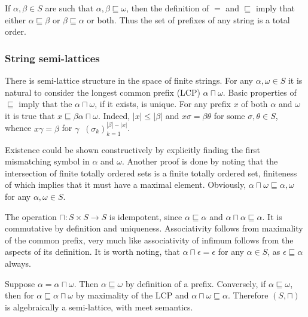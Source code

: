\documentclass[a4paper]{article}
\newcommand{\brac}[1]{{\left ( #1 \right )}}
\newcommand{\abs}[1]{{\left | #1 \right |}}
\newcommand{\defn}{\mathop{\overset{\Delta}{=}}\nolimits}
\begin{document}
If $\alpha, \beta\in S$ are such that $\alpha,\beta\sqsubseteq \omega$, then the definition of $=$ and $\sqsubseteq$ imply that either $\alpha\sqsubseteq\beta$ or $\beta\sqsubseteq\alpha$ or both. Thus the set of prefixes of any string is a total order.


\subsubsection{String semi-lattices} %
\label{ssub:string_semi_lattice}

There is semi-lattice structure in the space of finite strings. For any $\alpha,\omega\in S$ it is natural to consider the longest common prefix (LCP) $\alpha\sqcap \omega$. Basic properties of $\sqsubseteq$ imply that the $\alpha\sqcap \omega$, if it exists, is unique. For any prefix $x$ of both $\alpha$ and $\omega$ it is true that $x\sqsubseteq \beta \alpha\sqcap\omega$. Indeed, $\abs{x}\leq \abs{\beta}$ and $x\sigma = \beta\theta$ for some $\sigma,\theta\in S$, whence $x\gamma = \beta$ for $\gamma \defn \brac{\sigma_k}_{k=1}^{\abs{\beta}-\abs{x}}$.

Existence could be shown constructively by explicitly finding the first mismatching symbol in $\alpha$ and $\omega$. Another proof is done by noting that the intersection of finite totally ordered sets is a finite totally ordered set, finiteness of which implies that it must have a maximal element. Obviously, $\alpha\sqcap \omega\sqsubseteq \alpha,\omega$ for any $\alpha,\omega\in S$. 

The operation $\sqcap:S\times S\to S$ is idempotent, since $\alpha\sqsubseteq\alpha$ and $\alpha\sqcap \alpha \sqsubseteq \alpha$. It is commutative by definition and uniqueness. Associativity follows from maximality of the common prefix, very much like associativity of infimum follows from the aspects of its definition. It is worth noting, that $\alpha\sqcap \epsilon = \epsilon$ for any $\alpha\in S$, as $\epsilon\sqsubseteq \alpha$ always.

Suppose $\alpha = \alpha\sqcap\omega$. Then $\alpha\sqsubseteq \omega$ by definition of a prefix. Conversely, if $\alpha\sqsubseteq \omega$, then for $\alpha\sqsubseteq \alpha\sqcap\omega$ by maximality of the LCP and $\alpha\sqcap\omega\sqsubseteq\alpha$. Therefore $(S,\sqcap)$ is algebraically a semi-lattice, with meet semantics.

\end{document}
